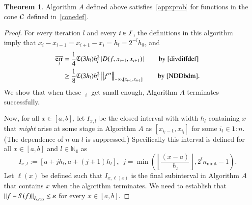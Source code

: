 \documentclass[review]{elsarticle}
\newcommand{\abstol}{\varepsilon}
\newcommand{\oton}{1\!:\!n}
\theoremstyle{definition}
\newcommand{\Ixl}{I_{x,l}}
\DeclareMathOperator{\ninit}{ninit}
\DeclareMathOperator{\oerr}{\overline{err}}
\newtheorem{theorem}{Theorem}
\begin{document}
\begin{theorem} \label{thm:algAworks}
	Algorithm $A$ defined above satisfies~\eqref{appxprob} for functions in the
	cone $\mathcal{C}$ defined in~\eqref{conedef}.
\end{theorem}

\begin{proof}
For every iteration $l$ and every $i \in \mathcal{I}$, the definitions in this algorithm
imply that $x_i-x_{i-1} = x_{i+1} - x_i = h_l = 2^{-l}h_0$, and
	\begin{align}
	\oerr_i
	& =  \frac{1}{4} \fC(3h_l) h_l^2 \abs{D(f,x_{i-1},x_{i+1})}
	\qquad \text{by \eqref{divdiffdef}}  \label{divdiffbd}\\
	& \ge \frac{1} 8 \fC(3h_l) h_l^2 \norm[-\infty,{[x_{i-1},x_{i+1}]}]{f''}
	\qquad \text{by \eqref{NDDbdm}}. \label{oerrlobd}
	\end{align}
We show that when these $\oerr_i$ get small enough, Algorithm $A$ terminates 
successfully.

Now, for all $x \in [a,b]$, let $\Ixl$ be the closed interval with width $h_l$
containing $x$ that \emph{might} arise at some stage in Algorithm $A$ as $[x_{i_l-1},
x_{i_l}]$ for some $i_l \in \oton$. (The dependence of $n$ on $l$ is
suppressed.) Specifically this interval is defined for all $ x \in [a,b]$ and $l
\in \mathbb{N}_0$ as
	\begin{equation}\label{Ixldef}
	\Ixl := \left[a+jh_l,a+(j+1) h_l\right], \ \ j=\min \left(\left\lfloor\frac{(x-a)}{h_l}\right\rfloor,
	2^l n_{\ninit}-1 \right ).
	\end{equation}
Let $\ell(x)$ be defined such that $I_{x,\ell(x)}$ is the final subinterval in
Algorithm $A$ that contains $x$ when the algorithm terminates. We need to
establish that $\norm[I_{x,\ell(x)}]{f - S(f)} \le \abstol$ for every $x \in
[a,b]$.


\end{proof}
\end{document}

